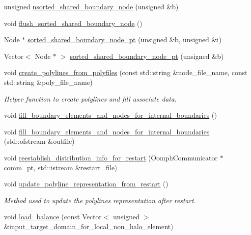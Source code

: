 \begin{DoxyCompactItemize}
unsigned \hyperlink{classoomph_1_1RefineableTriangleMesh_ad75bed93a7986b69f9bf928d88af294b}{nsorted\+\_\+shared\+\_\+boundary\+\_\+node} (unsigned \&b)
\item 
void \hyperlink{classoomph_1_1RefineableTriangleMesh_ad217a5617c922036481ded0de5e40aec}{flush\+\_\+sorted\+\_\+shared\+\_\+boundary\+\_\+node} ()
\item 
Node $\ast$ \hyperlink{classoomph_1_1RefineableTriangleMesh_a83d026092113ef41bd74e4d73928ebef}{sorted\+\_\+shared\+\_\+boundary\+\_\+node\+\_\+pt} (unsigned \&b, unsigned \&i)
\item 
Vector$<$ Node $\ast$ $>$ \hyperlink{classoomph_1_1RefineableTriangleMesh_a99f0a509d5e79e97129a6aa66644f0b7}{sorted\+\_\+shared\+\_\+boundary\+\_\+node\+\_\+pt} (unsigned \&b)
\item 
void \hyperlink{classoomph_1_1RefineableTriangleMesh_aeae7ba7543ed8e97d32c7c688da48521}{create\+\_\+polylines\+\_\+from\+\_\+polyfiles} (const std\+::string \&node\+\_\+file\+\_\+name, const std\+::string \&poly\+\_\+file\+\_\+name)
\begin{DoxyCompactList}\small\item\em Helper function to create polylines and fill associate data. \end{DoxyCompactList}\item 
void \hyperlink{classoomph_1_1RefineableTriangleMesh_adeac705bdac96a1fb1f9f75fb5552ef6}{fill\+\_\+boundary\+\_\+elements\+\_\+and\+\_\+nodes\+\_\+for\+\_\+internal\+\_\+boundaries} ()
\item 
void \hyperlink{classoomph_1_1RefineableTriangleMesh_a85db79355838698642937d8dd875970a}{fill\+\_\+boundary\+\_\+elements\+\_\+and\+\_\+nodes\+\_\+for\+\_\+internal\+\_\+boundaries} (std\+::ofstream \&outfile)
\item 
void \hyperlink{classoomph_1_1RefineableTriangleMesh_a3ecdb3b15c3fefbc96f407c4fdf5b155}{reestablish\+\_\+distribution\+\_\+info\+\_\+for\+\_\+restart} (Oomph\+Communicator $\ast$comm\+\_\+pt, std\+::istream \&restart\+\_\+file)
\item 
void \hyperlink{classoomph_1_1RefineableTriangleMesh_a26cdfda4b77158dd24641cb5889ad2ff}{update\+\_\+polyline\+\_\+representation\+\_\+from\+\_\+restart} ()
\begin{DoxyCompactList}\small\item\em Method used to update the polylines representation after restart. \end{DoxyCompactList}\item 
void \hyperlink{classoomph_1_1RefineableTriangleMesh_aaffa40b7d036f8ed8639bf9396f1088a}{load\+\_\+balance} (const Vector$<$ unsigned $>$ \&input\+\_\+target\+\_\+domain\+\_\+for\+\_\+local\+\_\+non\+\_\+halo\+\_\+element)

\end{DoxyCompactItemize}
